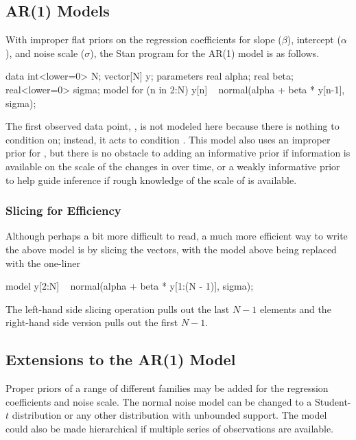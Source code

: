 \subsection{AR(1) Models}

With improper flat priors on the regression coefficients for slope
($\beta$), intercept ($\alpha$), and noise scale ($\sigma$),
the Stan program for the AR(1) model is as follows.
%
\begin{stancode}
data {
  int<lower=0> N;
  vector[N] y;
}
parameters {
  real alpha;
  real beta;
  real<lower=0> sigma;
}
model {
  for (n in 2:N)
    y[n] ~ normal(alpha + beta * y[n-1], sigma);
}
\end{stancode}
%
The first observed data point, , is not modeled here
because there is nothing to condition on; instead, it acts to
condition .  This model also uses an improper prior for
, but there is no obstacle to adding an informative prior
if information is available on the scale of the changes in 
over time, or a weakly informative prior to help guide inference if
rough knowledge of the scale of  is available.

\subsubsection{Slicing for Efficiency}

Although perhaps a bit more difficult to read, a much more efficient
way to write the above model is by slicing the vectors, with the model
above being replaced with the one-liner
%
\begin{stancode}
model {
  y[2:N] ~ normal(alpha + beta * y[1:(N - 1)], sigma);
}
\end{stancode}
%
The left-hand side slicing operation pulls out the last $N-1$
elements and the right-hand side version pulls out the first $N-1$.



\subsection{Extensions to the AR(1) Model}

Proper priors of a range of different families may be added for the
regression coefficients and noise scale.  The normal noise model can
be changed to a Student-$t$ distribution or any other distribution
with unbounded support.  The model could also be made hierarchical if
multiple series of observations are available.

